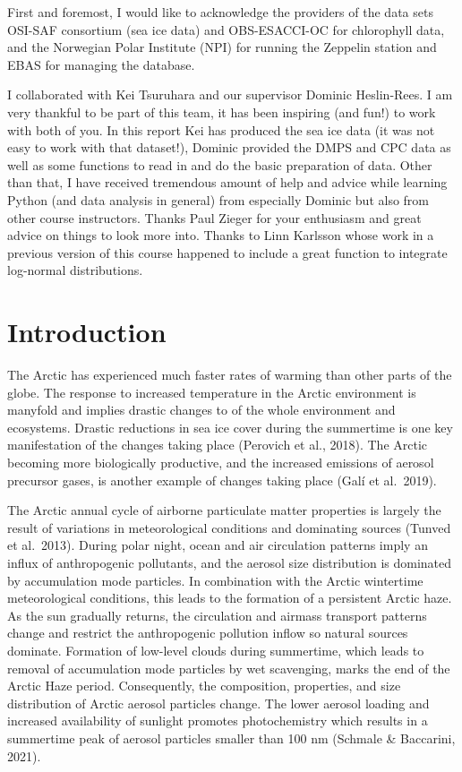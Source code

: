 \documentclass[11pt]{article}
\begin{document}
First and foremost, I would like to acknowledge the providers of the
data sets OSI-SAF consortium (sea ice data) and OBS-ESACCI-OC for
chlorophyll data, and the Norwegian Polar Institute (NPI) for running
the Zeppelin station and EBAS for managing the database.

I collaborated with Kei Tsuruhara and our supervisor Dominic
Heslin-Rees. I am very thankful to be part of this team, it has been
inspiring (and fun!) to work with both of you. In this report Kei has
produced the sea ice data (it was not easy to work with that dataset!),
Dominic provided the DMPS and CPC data as well as some functions to read
in and do the basic preparation of data. Other than that, I have
received tremendous amount of help and advice while learning Python (and
data analysis in general) from especially Dominic but also from other
course instructors. Thanks Paul Zieger for your enthusiasm and great
advice on things to look more into. Thanks to Linn Karlsson whose work
in a previous version of this course happened to include a great
function to integrate log-normal distributions.

    \hypertarget{introduction}{%
\section{Introduction}\label{introduction}}

The Arctic has experienced much faster rates of warming than other parts
of the globe. The response to increased temperature in the Arctic
environment is manyfold and implies drastic changes to of the whole
environment and ecosystems. Drastic reductions in sea ice cover during
the summertime is one key manifestation of the changes taking place
(Perovich et al., 2018). The Arctic becoming more biologically
productive, and the increased emissions of aerosol precursor gases, is
another example of changes taking place (Galí et al.~2019).

The Arctic annual cycle of airborne particulate matter properties is
largely the result of variations in meteorological conditions and
dominating sources (Tunved et al.~2013). During polar night, ocean and
air circulation patterns imply an influx of anthropogenic pollutants,
and the aerosol size distribution is dominated by accumulation mode
particles. In combination with the Arctic wintertime meteorological
conditions, this leads to the formation of a persistent Arctic haze. As
the sun gradually returns, the circulation and airmass transport
patterns change and restrict the anthropogenic pollution inflow so
natural sources dominate. Formation of low-level clouds during
summertime, which leads to removal of accumulation mode particles by wet
scavenging, marks the end of the Arctic Haze period. Consequently, the
composition, properties, and size distribution of Arctic aerosol
particles change. The lower aerosol loading and increased availability
of sunlight promotes photochemistry which results in a summertime peak
of aerosol particles smaller than 100 nm (Schmale \& Baccarini, 2021).
\end{document}

